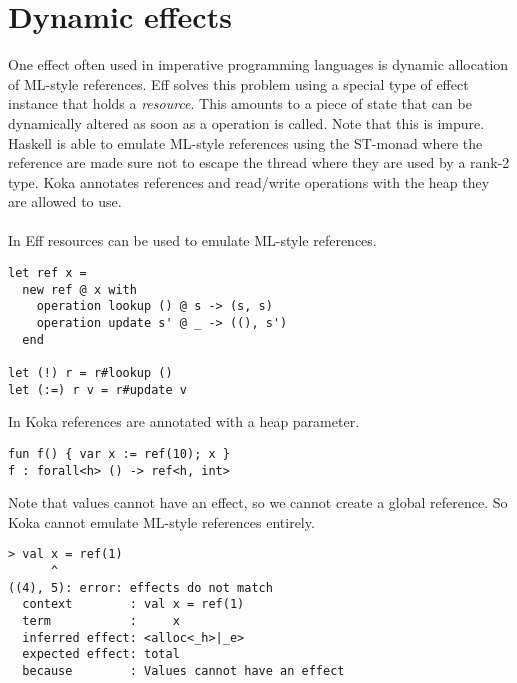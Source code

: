 \section{Dynamic effects}
One effect often used in imperative programming languages is dynamic allocation of ML-style references. Eff solves this problem using a special type of effect instance that holds a \textit{resource}.
This amounts to a piece of state that can be dynamically altered as soon as a operation is called. Note that this is impure. Haskell is able to emulate ML-style references using the ST-monad where the reference are made sure not to escape the thread where they are used by a rank-2 type. Koka annotates references and read/write operations with the heap they are allowed to use.
\\\\
In Eff resources can be used to emulate ML-style references.
\begin{lstlisting}
let ref x =
  new ref @ x with
    operation lookup () @ s -> (s, s)
    operation update s' @ _ -> ((), s')
  end

let (!) r = r#lookup ()
let (:=) r v = r#update v
\end{lstlisting}
In Koka references are annotated with a heap parameter.
\begin{lstlisting}
fun f() { var x := ref(10); x }
f : forall<h> () -> ref<h, int>
\end{lstlisting}
Note that values cannot have an effect, so we cannot create a global reference. So Koka cannot emulate ML-style references entirely.
\begin{lstlisting}
> val x = ref(1)
      ^
((4), 5): error: effects do not match
  context        : val x = ref(1)
  term           :     x
  inferred effect: <alloc<_h>|_e>
  expected effect: total
  because        : Values cannot have an effect
\end{lstlisting}

